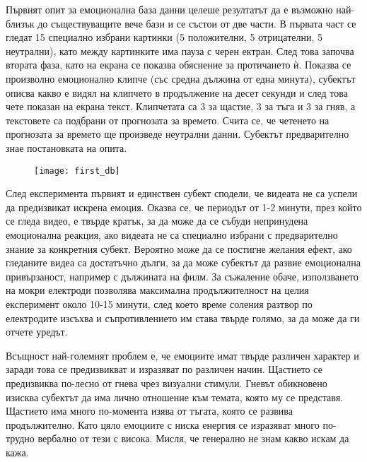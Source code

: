 \documentclass[main.tex]{subfiles}
\begin{document}
Първият опит за емоционална база данни целеше резултатът да е възможно най-близък до съществуващите вече бази и се състои от две части.
В първата част се гледат 15 специално избрани картинки (5 положителни, 5 отрицателни, 5 неутрални), като между картинките има пауза с черен ектран. След това започва втората фаза, като на екрана се показва обяснение за протичането ѝ. Показва се произволно емоционално клипче (със средна дължина от една минута), субектът описва какво е видял на клипчето в продължение на десет секунди и след това чете показан на екрана текст.
Клипчетата са 3 за щастие, 3 за тъга и 3 за гняв, а текстовете са подбрани от прогнозата за времето. Счита се, че четенето на прогнозата за времето ще произведе неутрални данни.
Субектът предварително знае постановката на опита.

\begin{figure}[ht]%
    \texttt{[image: first\_db]}%
    \label{fig:brain_res:1}
\end{figure}

След експеримента първият и единствен субект сподели, че видеата не са успели да предизвикат искрена емоция. Оказва се, че периодът от 1-2 минути, през който се гледа видео, е твърде кратък, за да може да се събуди непринудена емоционална реакция, ако видеата не са специално избрани с предварително знание за конкретния субект. Вероятно може да се постигне желания ефект, ако гледаните видеа са достатъчно дълги, за да може субектът да развие емоционална привързаност, например с дължината на филм. За съжаление обаче, използването на мокри електроди позволява максимална продължителност на целия експеримент около 10-15 минути, след което време соления разтвор по електродите изсъхва и съпротивлението им става твърде голямо, за да може да ги отчете уредът. 

Всъщност най-големият проблем е, че емоциите имат твърде различен характер и заради това се предизвикват и изразяват по различен начин. Щастието се предизвиква по-лесно от гнева чрез визуални стимули. Гневът обикновено изисква субектът да има лично отношение към темата, която му се представя. Щастието има много по-момента изява от тъгата, която се развива продължително. Като цяло емоциите с ниска енергия се изразяват много по-трудно вербално от тези с висока. 
Мисля, че генерално не знам какво искам да кажа.
\end{document}

